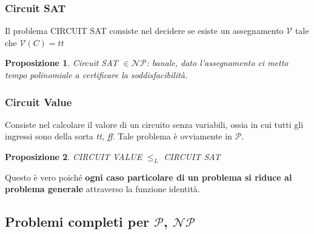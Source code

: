 \documentclass[a4paper,10pt,oneside]{article}
\theoremstyle{break}
\newtheorem{prop}{Proposizione}[subsection]
\begin{document}
\subsubsection{Circuit SAT}

Il problema CIRCUIT SAT consiste nel decidere se esiste un assegnamento $\mathcal{V}$ tale che $\mathcal V(C) = tt$
\begin{mdframed}

\begin{prop}
 Circuit SAT $\in \mathcal{NP}$: banale, dato l'assegnamento ci metto tempo polinomiale a certificare la soddisfacibilità.
\end{prop}

\end{mdframed}

\subsubsection{Circuit Value}
Consiste nel calcolare il valore di un circuito senza variabili, ossia in cui tutti gli ingressi sono della sorta \textit{tt, ff}. Tale problema è ovviamente in $\mathcal P$.

\begin{mdframed}
 
\begin{prop}
CIRCUIT VALUE $\leq_L$ CIRCUIT SAT 
\end{prop}

\dotfill

Questo è vero poiché \textbf{ogni caso particolare di un problema si riduce al problema generale} attraverso la funzione identità.

\end{mdframed}

\newpage

\subsection{Problemi completi per $\mathcal P$, $\mathcal{NP}$}
\end{document}
